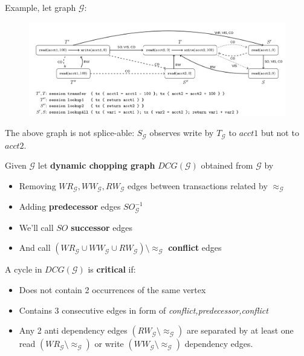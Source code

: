 \documentclass{beamer}
\begin{document}
\begin{frame}
Example, let graph $\mathcal{G}$:
\begin{figure}
	\includegraphics[scale=0.28]{fig4}
\end{figure}
The above graph is not splice-able: $\boxed{S}_\mathcal{G}$ observes write by $\boxed{T}_\mathcal{G}$ to $acct1$ but not to $acct2$.
\end{frame}

\begin{frame}
	Given $\mathcal{G}$ let \textbf{dynamic chopping graph} $DCG(\mathcal{G})$ obtained from $\mathcal{G}$ by
	\begin{itemize}
		\item Removing $WR_\mathcal{G}, WW_\mathcal{G}, RW_\mathcal{G}$ edges between transactions related by $\approx_\mathcal{G}$
		\item Adding \textbf{predecessor} edges $SO^{-1}_\mathcal{G}$
		\item We'll call $SO$ \textbf{successor} edges
		\item And  call $\left( WR_\mathcal{G} \cup WW_\mathcal{G} \cup RW_\mathcal{G} \right) \setminus \approx_\mathcal{G}$ \textbf{conflict} edges
	\end{itemize}
\end{frame}

\begin{frame}
A cycle in $DCG(\mathcal{G})$ is \textbf{critical} if:
\begin{itemize}
	\item Does not contain 2 occurrences of the same vertex
	\item Contains 3 consecutive edges in form of \textit{conflict,predecessor,conflict}
	\item Any 2 anti dependency edges $(RW_\mathcal{G}\setminus \approx_\mathcal{G})$ are separated by at least one read $(WR_\mathcal{G}\setminus \approx_\mathcal{G})$ or write $(WW_\mathcal{G}\setminus \approx_\mathcal{G})$ dependency edges.
\end{itemize}
\end{frame}
\end{document}
